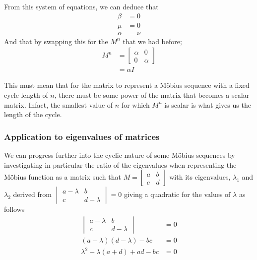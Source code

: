 \documentclass[12pt]{article}
\begin{document}
From this system of equations, we can deduce that
\begin{align*}
	\beta  & =0   \\
	\mu    & =0   \\
	\alpha & =\nu
\end{align*}
And that by swapping this for the $M^n$ that we had before;
\begin{align*}
M^n &= \begin{bmatrix}
	\alpha & 0      \\
	0      & \alpha
\end{bmatrix} \\
	&= \alpha I
\end{align*}

\newpage
This must mean that for the matrix to represent a Möbius sequence with a fixed cycle length of $n$, there must be some power of the matrix that becomes a scalar matrix. Infact, the smallest value of $n$ for which $M^n$ is scalar is what gives us the length of the cycle.
\subsubsection{Application to eigenvalues of matrices}\label{sec:mobEig}
We can progress further into the cyclic nature of some Möbius sequences by investigating in particular the ratio of the eigenvalues when representing the Möbius function as a matrix such that $M = \begin{bmatrix} a & b \\ c & d \end{bmatrix}$
with its eigenvalues, $\lambda_1$ and $\lambda_2$ derived from 
$\begin{vmatrix}
	a-\lambda & b         \\
	c         & d-\lambda
\end{vmatrix} = 0$ giving a quadratic for the values of $\lambda$ as follows
		\begin{align*}
			\begin{vmatrix}
				a-\lambda & b         \\
				c         & d-\lambda
			\end{vmatrix} &= 0 \\[5pt]
			(a-\lambda)(d-\lambda)-bc&=0 \\[5pt]
			{\lambda}^2-\lambda(a+d)+ad-bc&=0
		\end{align*}
\end{document}
